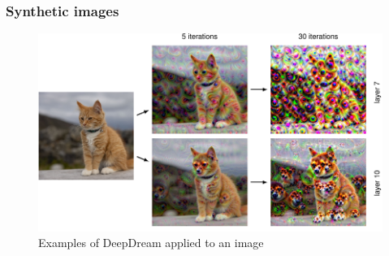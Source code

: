 \documentclass{beamer}
\begin{document}
\begin{frame}
    \frametitle{Synthetic images}
    \begin{figure}
        \caption{Examples of DeepDream applied to an image}
        \includegraphics[height=0.6\textheight]{Figure_18.pdf}
    \end{figure}
\end{frame}
\end{document}
